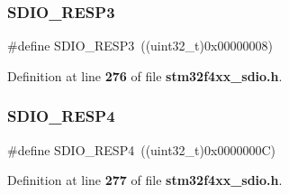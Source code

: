 \subsubsection{S\+D\+I\+O\+\_\+\+R\+E\+S\+P3}
{\footnotesize\ttfamily \#define S\+D\+I\+O\+\_\+\+R\+E\+S\+P3~((uint32\+\_\+t)0x00000008)}



Definition at line \textbf{ 276} of file \textbf{ stm32f4xx\+\_\+sdio.\+h}.

\mbox{\label{group__SDIO__Response__Registers_ga57c3f6414198e5497736e398c02a1d9e}} 
\subsubsection{S\+D\+I\+O\+\_\+\+R\+E\+S\+P4}
{\footnotesize\ttfamily \#define S\+D\+I\+O\+\_\+\+R\+E\+S\+P4~((uint32\+\_\+t)0x0000000\+C)}



Definition at line \textbf{ 277} of file \textbf{ stm32f4xx\+\_\+sdio.\+h}.

